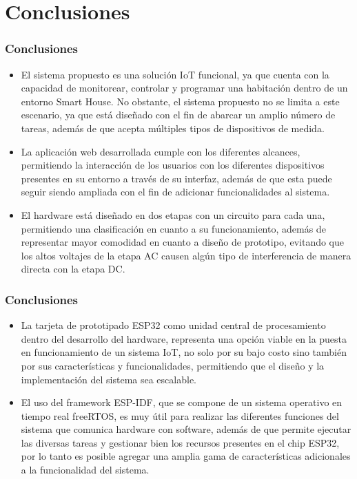 \section{Conclusiones}
\begin{frame}[t]
\frametitle{Conclusiones}
\small
\begin{itemize}
	\item El sistema propuesto es una solución IoT funcional, ya que cuenta con la capacidad de monitorear, controlar y programar una habitación dentro de un entorno Smart House. No obstante, el sistema propuesto no se limita a este escenario, ya que está diseñado con el fin de abarcar un amplio número de tareas, además de que acepta múltiples tipos de dispositivos de medida.
	
	\item La aplicación web desarrollada cumple con los diferentes alcances, permitiendo la interacción de los usuarios con los diferentes dispositivos presentes en su entorno a través de su interfaz, además de que esta puede seguir siendo ampliada con el fin de adicionar funcionalidades al sistema.
	
	\item El hardware está diseñado en dos etapas con un circuito para cada una, permitiendo una clasificación en cuanto a su funcionamiento, además de representar mayor comodidad en cuanto a diseño de prototipo, evitando que los altos voltajes de la etapa AC causen algún tipo de interferencia de manera directa con la etapa DC.
	
\end{itemize}
\end{frame}

\begin{frame}[t]
\frametitle{Conclusiones}
\begin{itemize}
	\item La tarjeta de prototipado ESP32 como unidad central de procesamiento dentro del desarrollo del hardware, representa una opción viable en la puesta en funcionamiento de un sistema IoT, no solo por su bajo costo sino también por sus características y funcionalidades, permitiendo que el diseño y la implementación del sistema sea escalable.
	
	\item El uso del framework ESP-IDF, que se compone de un sistema operativo en tiempo real freeRTOS, es muy útil para realizar las diferentes funciones del sistema que comunica hardware con software, además de que permite ejecutar las diversas tareas y gestionar bien los recursos presentes en el chip ESP32, por lo tanto es posible agregar una amplia gama de características adicionales a la funcionalidad del sistema.
\end{itemize}
\end{frame}